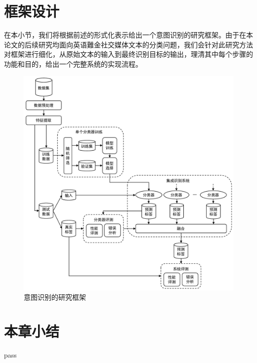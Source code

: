\section{框架设计}

在本小节，我们将根据前述的形式化表示给出一个意图识别的研究框架。由于在本论文的后续研究均面向英语難金社交媒体文本的分类问题，我们会针对此研究方法对框架进行细化，从原始文本的输入到最终识别目标的输出，理清其中每个步骤的功能和目的，给出一个完整系统的实现流程。

\begin{figure}[H] %
  \centering
  \includegraphics[width=\textwidth]{img/framework.pdf}
  \caption{意图识别的研究框架}
  \label{fig:framework}
\end{figure}


\section{本章小结}

pass

